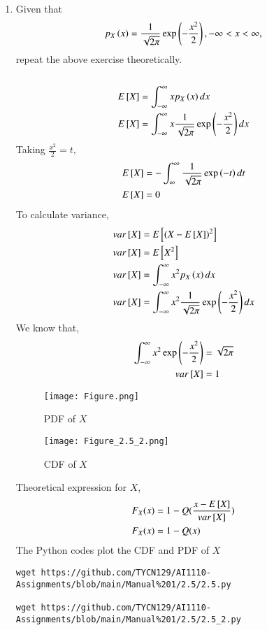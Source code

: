 \documentclass[journal,12pt,twocolumn]{IEEEtran}
\renewcommand\thesection{\arabic{section}}
\begin{document}
\begin{enumerate}[label=\thesection.\arabic*
,ref=\thesection.\theenumi]
\item Given that 
\begin{align}
p_{X}\left(x\right) = \frac{1}{\sqrt{2\pi}}\exp\left(-\frac{x^2}{2}\right), -\infty < x < \infty,
\end{align}
repeat the above exercise theoretically.\\
\solution\\
\begin{align}
    E{}\left[X\right] &= \int_{-\infty}^{\infty}x p_{X}\left(x\right) dx \\
    E{}\left[X\right] &= \int_{-\infty}^{\infty}x
    \frac{1}{\sqrt{2\pi}}\exp\left(-\frac{x^2}{2}\right) dx    
\end{align}
Taking $\frac{x^2}{2} = t$,
\begin{align}
    E{}\left[X\right] &= -\int_{\infty}^{\infty}
    \frac{1}{\sqrt{2\pi}}\exp\left(-t\right) dt\\
    E{}\left[X\right] &= 0
\end{align}
To calculate variance,
\begin{align}
    var{}\left[X\right] &= E{}\left[(X - E{}\left[X\right])^2\right]\\
    var{}\left[X\right] &= E{}\left[X^2\right]\\
    var{}\left[X\right] &= \int_{-\infty}^{\infty}x^2 p_{X}\left(x\right) dx \\
    var{}\left[X\right] &= \int_{-\infty}^{\infty}x^2
    \frac{1}{\sqrt{2\pi}}\exp\left(-\frac{x^2}{2}\right) dx 
\end{align}
We know that,
\begin{align}
    \int_{-\infty}^{\infty}x^2\exp\left(-\frac{x^2}{2}\right) &= \sqrt{2\pi}\\
    var{}\left[X\right] &= 1
\end{align}
\begin{figure}[h!]
    \centering
    \texttt{[image: Figure.png]}
    \caption{PDF of $X$}
    \label{fig:my_label}
\end{figure}

\begin{figure}[h!]
    \centering
    \texttt{[image: Figure\_2.5\_2.png]}
    \caption{CDF of $X$}
    \label{fig:my_label}
\end{figure}

Theoretical expression for $X$,
\begin{align}
    F_X(x) &= 1 - Q(\frac{x - E{}\left[X\right]}{var{}\left[X\right]})\\
    F_X(x) &= 1 - Q(x)
\end{align}
The Python codes plot the CDF and PDF of $X$
\begin{lstlisting}
wget https://github.com/TYCN129/AI1110-Assignments/blob/main/Manual%201/2.5/2.5.py

wget https://github.com/TYCN129/AI1110-Assignments/blob/main/Manual%201/2.5/2.5_2.py
\end{lstlisting}
\end{enumerate}
\end{document}

